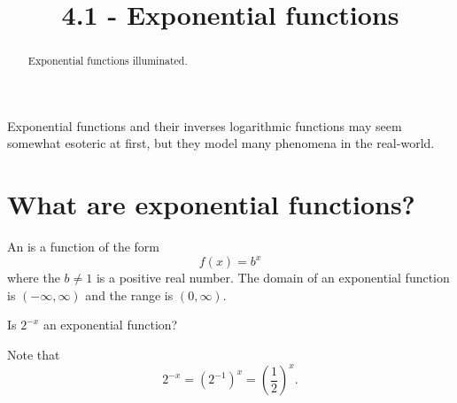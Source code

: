 \documentclass{ximera}
\title{4.1 - Exponential functions}
\begin{document}
\begin{abstract}
  Exponential functions illuminated.
\end{abstract}
\maketitle

Exponential functions and their inverses logarithmic functions may seem somewhat esoteric at
first, but they model many phenomena in the real-world.



\section{What are exponential functions?}


\begin{definition}
  An  is a function of the form
  \[
  f(x) = b^x
  \]
  where the  $b\ne 1$ is a positive real number. The domain of an
  exponential function is $(-\infty,\infty)$ and the range is $(0, \infty)$.
\end{definition}

\begin{question}
  Is $2^{-x}$ an exponential function?
  \begin{multipleChoice}
  \end{multipleChoice}
  \begin{feedback}
    Note that
    \[
    2^{-x} = \left(2^{-1}\right)^x = \left(\frac{1}{2}\right)^x.
    \]
  \end{feedback}
\end{question}


%
%
%
%   
\end{document}
